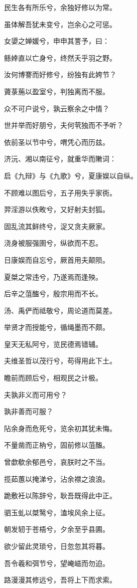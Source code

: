 \documentclass[12pt,a4paper]{ctexbook}
\begin{document}
民生各有所乐兮，余独好修以为常。\par
虽体解吾犹未变兮，岂余心之可惩。\par
女嬃之婵媛兮，申申其詈予，曰：\par
鲧婞直以亡身兮，终然夭乎羽之野。\par
汝何博謇而好修兮，纷独有此姱节？\par
薋菉葹以盈室兮，判独离而不服。\par
众不可户说兮，孰云察余之中情？\par
世并举而好朋兮，夫何茕独而不予听？\par
依前圣以节中兮，喟凭心而历兹。\par
济沅、湘以南征兮，就重华而敶词：\par
启《九辩》与《九歌》兮，夏康娱以自纵。\par
不顾难以图后兮，五子用失乎家衖。\par
羿淫游以佚畋兮，又好射夫封狐。\par
固乱流其鲜终兮，浞又贪夫厥家。\par
浇身被服强圉兮，纵欲而不忍。\par
日康娱而自忘兮，厥首用夫颠陨。\par
夏桀之常违兮，乃遂焉而逢殃。\par
后辛之菹醢兮，殷宗用而不长。\par
汤、禹俨而祗敬兮，周论道而莫差。\par
举贤才而授能兮，循绳墨而不颇。\par
皇天无私阿兮，览民德焉错辅。\par
夫维圣哲以茂行兮，苟得用此下土。\par
瞻前而顾后兮，相观民之计极。\par
夫孰非义而可用兮？\par
孰非善而可服？\par
阽余身而危死兮，览余初其犹未悔。\par
不量凿而正枘兮，固前修以菹醢。\par
曾歔欷余郁邑兮，哀朕时之不当。\par
揽茹蕙以掩涕兮，沾余襟之浪浪。\par
跪敷衽以陈辞兮，耿吾既得此中正。\par
驷玉虬以桀鹥兮，溘埃风余上征。\par
朝发轫于苍梧兮，夕余至乎县圃。\par
欲少留此灵琐兮，日忽忽其将暮。\par
吾令羲和弭节兮，望崦嵫而勿迫。\par
路漫漫其修远兮，吾将上下而求索。\par
\end{document}
